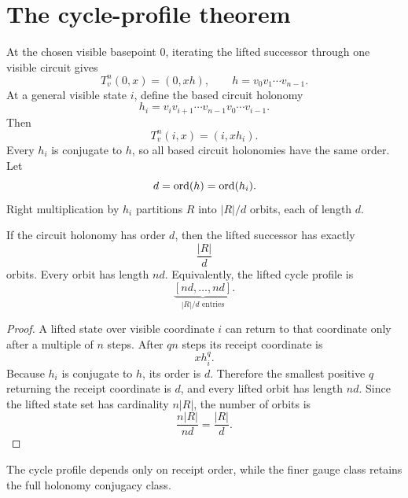 \section{The cycle-profile theorem}

At the chosen visible basepoint $0$, iterating the lifted successor through
one visible circuit gives
\[
T_v^n(0,x)=(0,xh),
\qquad
h=v_0v_1\cdots v_{n-1}.
\]
At a general visible state $i$, define the based circuit holonomy
\[
h_i
=
v_i v_{i+1}\cdots v_{n-1}v_0\cdots v_{i-1}.
\]
Then
\[
T_v^n(i,x)=(i,xh_i).
\]
Every $h_i$ is conjugate to $h$, so all based circuit holonomies have the
same order. Let
\[
d=\operatorname{ord}(h)=\operatorname{ord}(h_i).
\]
Right multiplication by $h_i$ partitions $R$ into $|R|/d$ orbits, each of
length $d$.

\begin{theorem}
If the circuit holonomy has order $d$, then the lifted successor has exactly
\[
\frac{|R|}{d}
\]
orbits. Every orbit has length $nd$. Equivalently, the lifted cycle profile is
\[
\underbrace{[nd,\ldots,nd]}_{|R|/d\text{ entries}}.
\]
\end{theorem}

\begin{proof}
A lifted state over visible coordinate $i$ can return to that coordinate only
after a multiple of $n$ steps. After $qn$ steps its receipt coordinate is
\[
xh_i^q.
\]
Because $h_i$ is conjugate to $h$, its order is $d$. Therefore the smallest
positive $q$ returning the receipt coordinate is $d$, and every lifted orbit
has length $nd$. Since the lifted state set has cardinality $n|R|$, the
number of orbits is
\[
\frac{n|R|}{nd}=\frac{|R|}{d}.
\]
\end{proof}

The cycle profile depends only on receipt order, while the finer gauge class
retains the full holonomy conjugacy class.

